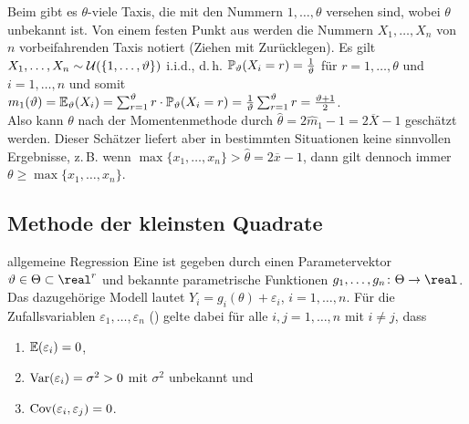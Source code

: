 \begin{Bsp}
    Beim  gibt es $\theta$-viele Taxis, die mit den Nummern
    $1, \dotsc, \theta$ versehen sind, wobei $\theta$ unbekannt ist.
    Von einem festen Punkt aus werden die Nummern $X_1, \dotsc, X_n$ von $n$ vorbeifahrenden
    Taxis notiert (Ziehen mit Zurücklegen).
    Es gilt $X_1, \dotsc, X_n \sim \mathcal{U}(\{1, \dotsc, \vartheta\})$ i.i.d.,
    d.\,h. $\mathbb{P}_\vartheta(X_i = r) = \frac{1}{\vartheta}$ für $r = 1, \dotsc, \theta$ und
    $i = 1, \dotsc, n$ und somit\\
    $m_1(\vartheta) = \mathbb{E}_\vartheta(X_i) = \sum_{r=1}^\vartheta r \cdot \mathbb{P}_\vartheta(X_i = r)
    = \frac{1}{\vartheta} \sum_{r=1}^\vartheta r = \frac{\vartheta + 1}{2}$.\\
    Also kann $\theta$ nach der Momentenmethode durch $\widehat{\theta} = 2\widehat{m}_1 - 1 =
    2\overline{X} - 1$ geschätzt werden.
    Dieser Schätzer liefert aber in bestimmten Situationen keine sinnvollen Ergebnisse, z.\,B.
    wenn $\max\{x_1, \dotsc, x_n\} > \widehat{\theta} = 2\overline{x} - 1$,
    dann gilt dennoch immer $\theta \ge \max\{x_1, \dotsc, x_n\}$.
\end{Bsp}

\subsection{%
    Methode der kleinsten Quadrate%
}

\begin{Def}{allgemeine Regression}
    Eine  ist gegeben durch einen Parametervektor
    $\theta \in \Theta \subset \real^r$ und bekannte parametrische Funktionen
    $g_1, \dotsc, g_n\colon \Theta \rightarrow \real$.
    Das dazugehörige Modell lautet $Y_i = g_i(\theta) + \varepsilon_i$, $i = 1, \dotsc, n$.
    Für die Zufallsvariablen $\varepsilon_1, \dotsc, \varepsilon_n$ ()
    gelte dabei für alle $i, j = 1, \dotsc, n$ mit $i \not= j$, dass
    \begin{enumerate}
        \item
        $\mathbb{E}(\varepsilon_i) = 0$,
        
        \item
        $\mathrm{Var}(\varepsilon_i) = \sigma^2 > 0$ mit $\sigma^2$ unbekannt und
        
        \item
        $\mathrm{Cov}(\varepsilon_i, \varepsilon_j) = 0$.
    \end{enumerate}
\end{Def}

